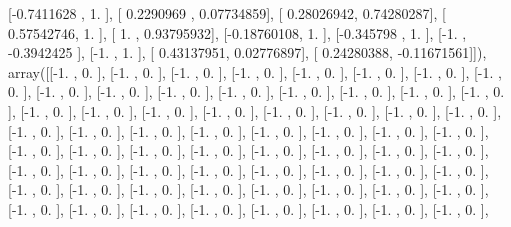 \documentclass{article}
\begin{document}
       [-0.7411628 ,  1.        ],
       [ 0.2290969 ,  0.07734859],
       [ 0.28026942,  0.74280287],
       [ 0.57542746,  1.        ],
       [ 1.        ,  0.93795932],
       [-0.18760108,  1.        ],
       [-0.345798  ,  1.        ],
       [-1.        , -0.3942425 ],
       [-1.        ,  1.        ],
       [ 0.43137951,  0.02776897],
       [ 0.24280388, -0.11671561]]), array([[-1.        ,  0.        ],
       [-1.        ,  0.        ],
       [-1.        ,  0.        ],
       [-1.        ,  0.        ],
       [-1.        ,  0.        ],
       [-1.        ,  0.        ],
       [-1.        ,  0.        ],
       [-1.        ,  0.        ],
       [-1.        ,  0.        ],
       [-1.        ,  0.        ],
       [-1.        ,  0.        ],
       [-1.        ,  0.        ],
       [-1.        ,  0.        ],
       [-1.        ,  0.        ],
       [-1.        ,  0.        ],
       [-1.        ,  0.        ],
       [-1.        ,  0.        ],
       [-1.        ,  0.        ],
       [-1.        ,  0.        ],
       [-1.        ,  0.        ],
       [-1.        ,  0.        ],
       [-1.        ,  0.        ],
       [-1.        ,  0.        ],
       [-1.        ,  0.        ],
       [-1.        ,  0.        ],
       [-1.        ,  0.        ],
       [-1.        ,  0.        ],
       [-1.        ,  0.        ],
       [-1.        ,  0.        ],
       [-1.        ,  0.        ],
       [-1.        ,  0.        ],
       [-1.        ,  0.        ],
       [-1.        ,  0.        ],
       [-1.        ,  0.        ],
       [-1.        ,  0.        ],
       [-1.        ,  0.        ],
       [-1.        ,  0.        ],
       [-1.        ,  0.        ],
       [-1.        ,  0.        ],
       [-1.        ,  0.        ],
       [-1.        ,  0.        ],
       [-1.        ,  0.        ],
       [-1.        ,  0.        ],
       [-1.        ,  0.        ],
       [-1.        ,  0.        ],
       [-1.        ,  0.        ],
       [-1.        ,  0.        ],
       [-1.        ,  0.        ],
       [-1.        ,  0.        ],
       [-1.        ,  0.        ],
       [-1.        ,  0.        ],
       [-1.        ,  0.        ],
       [-1.        ,  0.        ],
       [-1.        ,  0.        ],
       [-1.        ,  0.        ],
       [-1.        ,  0.        ],
       [-1.        ,  0.        ],
       [-1.        ,  0.        ],
       [-1.        ,  0.        ],
       [-1.        ,  0.        ],
       [-1.        ,  0.        ],
       [-1.        ,  0.        ],
       [-1.        ,  0.        ],
       [-1.        ,  0.        ],
\end{document}
